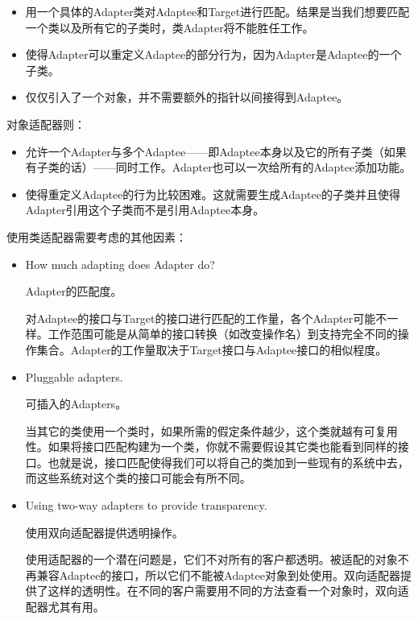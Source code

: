 \begin{itemize}

	\item 用一个具体的Adapter类对Adaptee和Target进行匹配。结果是当我们想要匹配一个类以及所有它的子类时，类Adapter将不能胜任工作。

	\item 使得Adapter可以重定义Adaptee的部分行为，因为Adapter是Adaptee的一个子类。

	\item 仅仅引入了一个对象，并不需要额外的指针以间接得到Adaptee。

\end{itemize}

对象适配器则：

\begin{itemize}

	\item 允许一个Adapter与多个Adaptee——即Adaptee本身以及它的所有子类（如果有子类的话）——同时工作。Adapter也可以一次给所有的Adaptee添加功能。

	\item 使得重定义Adaptee的行为比较困难。这就需要生成Adaptee的子类并且使得Adapter引用这个子类而不是引用Adaptee本身。

\end{itemize}

使用类适配器需要考虑的其他因素：

\begin{itemize}

	\item How much adapting does Adapter do?

	Adapter的匹配度。

	对Adaptee的接口与Target的接口进行匹配的工作量，各个Adapter可能不一样。工作范围可能是从简单的接口转换（如改变操作名）到支持完全不同的操作集合。Adapter的工作量取决于Target接口与Adaptee接口的相似程度。

	\item Pluggable adapters.

	可插入的Adapters。

	当其它的类使用一个类时，如果所需的假定条件越少，这个类就越有可复用性。如果将接口匹配构建为一个类，你就不需要假设其它类也能看到同样的接口。也就是说，接口匹配使得我们可以将自己的类加到一些现有的系统中去，而这些系统对这个类的接口可能会有所不同。

	\item Using two-way adapters to provide transparency.

	使用双向适配器提供透明操作。

	使用适配器的一个潜在问题是，它们不对所有的客户都透明。被适配的对象不再兼容Adaptee的接口，所以它们不能被Adaptee对象到处使用。双向适配器提供了这样的透明性。在不同的客户需要用不同的方法查看一个对象时，双向适配器尤其有用。



\end{itemize}


